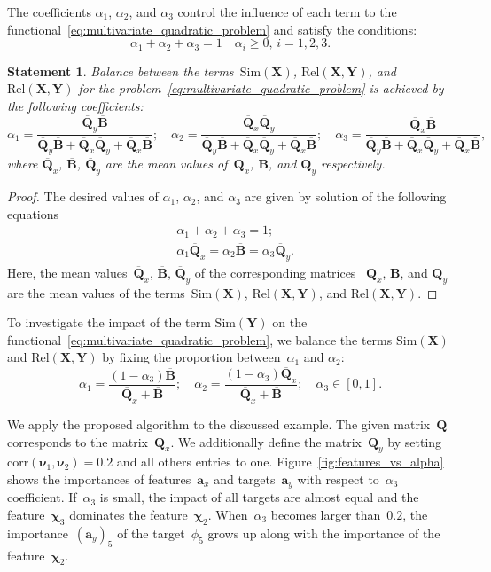 \documentclass[12pt,twoside]{article}
\newtheorem{statement}{Statement}
\newcommand{\ba}{\mathbf{a}}
\newcommand{\bY}{\mathbf{Y}}
\newcommand{\bX}{\mathbf{X}}
\newcommand{\bB}{\mathbf{B}}
\newcommand{\bQ}{\mathbf{Q}}
\newcommand{\bchi}{\boldsymbol{\chi}}
\newcommand{\bnu}{\boldsymbol{\nu}}
\begin{document}
The coefficients $\alpha_1$, $\alpha_2$, and $\alpha_3$ control the influence of each term to the functional~\eqref{eq:multivariate_quadratic_problem} and satisfy the conditions:
\[
\alpha_1 + \alpha_2 + \alpha_3 = 1 \quad \alpha_i \geq 0, \, i = 1, 2, 3.
\]
\begin{statement}
	Balance between the terms~$\text{Sim}(\bX)$, $\text{Rel}(\bX, \bY)$, and $\text{Rel}(\bX, \bY)$ for the problem~\eqref{eq:multivariate_quadratic_problem} is achieved by the following coefficients:
	\[
	\alpha_1 = \frac{\overline{\bQ}_y \overline{\bB} }{\overline{\bQ}_y \overline{\bB} + \overline{\bQ}_x \overline{\bQ}_y + \overline{\bQ}_x \overline{\bB}}; \quad
	\alpha_2 = \frac{\overline{\bQ}_x \overline{\bQ}_y}{\overline{\bQ}_y \overline{\bB} + \overline{\bQ}_x \overline{\bQ}_y + \overline{\bQ}_x \overline{\bB}}; \quad
	\alpha_3  = \frac{\overline{\bQ}_x \overline{\bB}}{\overline{\bQ}_y \overline{\bB} + \overline{\bQ}_x \overline{\bQ}_y + \overline{\bQ}_x \overline{\bB}},
	\]
	where $\overline{\bQ}_x$, $\overline{\bB}$, $\overline{\bQ}_y$ are the mean values of~$\bQ_x$, $\bB$, and $\bQ_y$ respectively.

\end{statement}
\begin{proof}
	The desired values of $\alpha_1$, $\alpha_2$, and $\alpha_3$ are given by solution of the following equations
	\begin{align*}
		&\alpha_1 + \alpha_2 + \alpha_3 = 1; \\
		&\alpha_1 \overline{\bQ}_x = \alpha_2 \overline{\bB} = \alpha_3 \overline{\bQ}_y.
	\end{align*}
	Here, the mean values~$\overline{\bQ}_x$, $\overline{\bB}$, $\overline{\bQ}_y$ of the corresponding matrices ~$\bQ_x$, $\bB$, and $\bQ_y$ are the mean values of the terms~$\text{Sim}(\bX)$, $\text{Rel}(\bX, \bY)$, and $\text{Rel}(\bX, \bY)$.
\end{proof}
To investigate the impact of the term $\text{Sim}(\bY)$ on the functional~\eqref{eq:multivariate_quadratic_problem}, we balance the terms $\text{Sim}(\bX)$ and $\text{Rel}(\bX, \bY)$ by fixing the proportion between~$\alpha_1$ and $\alpha_2$:
\begin{equation}
\alpha_1 = \frac{(1 - \alpha_3)\overline{\bB}}{\overline{\bQ}_x + \overline{\bB}}; \quad
\alpha_2 = \frac{(1 - \alpha_3)\overline{\bQ}_x}{\overline{\bQ}_x + \overline{\bB}}; \quad
\alpha_3 \in [0, 1].
\label{eq:alphas3}
\end{equation}

We apply the proposed algorithm to the discussed example.
The given matrix~$\bQ$ corresponds to the matrix~$\bQ_x$.
We additionally define the matrix~$\bQ_y$ by setting $\text{corr}(\bnu_1, \bnu_2) = 0.2$ and all others entries to one.
Figure~\ref{fig:features_vs_alpha} shows the importances of features~$\ba_x$ and targets~$\ba_y$ with respect to~$\alpha_3$ coefficient.
If~$\alpha_3$ is small, the impact of all targets are almost equal and the feature~$\bchi_3$ dominates the feature~$\bchi_2$. When~$\alpha_3$ becomes larger than~$0.2$, the importance~$(\ba_y)_5$ of the target~$\phi_5$ grows up along with the importance of the feature~$\bchi_2$.
\end{document}
